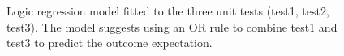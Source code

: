 \documentclass[
  12pt,
]{interact}
\begin{document}
\label{cell-fig-logic-reg}
\begin{figure}[H]


\caption{\label{fig-logic-reg}Logic regression model fitted to the three
unit tests (test1, test2, test3). The model suggests using an OR rule to
combine test1 and test3 to predict the outcome expectation.}

\end{figure}%
\end{document}
